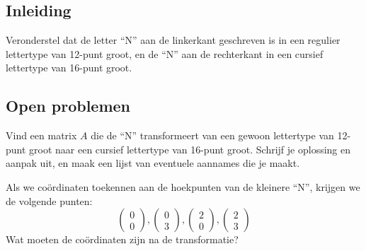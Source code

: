 \documentclass{ximera}
\begin{document}
\author{Alexander Holvoet}

\subsection*{Inleiding}
Veronderstel dat de letter ``N'' aan de linkerkant geschreven is in een regulier lettertype van 12-punt groot, en de ``N'' aan de rechterkant in een cursief lettertype van 16-punt groot.

\begin{figure}[H]
\end{figure}

\subsection*{Open problemen}

\begin{exercise}
    Vind een matrix $A$ die de ``N'' transformeert van een gewoon lettertype van 12-punt groot naar een cursief lettertype van 16-punt groot.
    Schrijf je oplossing en aanpak uit, en maak een lijst van eventuele aannames die je maakt.
    \begin{hint}
    Als we coördinaten toekennen aan de hoekpunten van de kleinere ``N'', krijgen we de volgende punten:
    \[\begin{pmatrix}0 \\ 0\end{pmatrix}, \begin{pmatrix}0 \\ 3\end{pmatrix}, \begin{pmatrix}2 \\ 0\end{pmatrix}, \begin{pmatrix}2 \\ 3\end{pmatrix}\]
    Wat moeten de coördinaten zijn na de transformatie?
    \end{hint}
\end{exercise}
\end{document}
